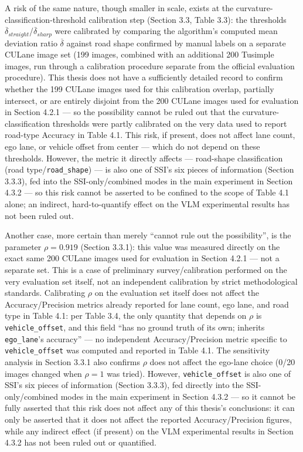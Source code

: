 \documentclass[12pt,a4paper]{report}
\begin{document}
A risk of the same nature, though smaller in scale, exists at the curvature-classification-threshold calibration step (Section 3.3, Table 3.3): the thresholds $\overline{\delta}_{straight}$/$\overline{\delta}_{sharp}$ were calibrated by comparing the algorithm's computed mean deviation ratio $\overline{\delta}$ against road shape confirmed by manual labels on a separate CULane image set (199 images, combined with an additional 200 Tusimple images, run through a calibration procedure separate from the official evaluation procedure). This thesis does not have a sufficiently detailed record to confirm whether the 199 CULane images used for this calibration overlap, partially intersect, or are entirely disjoint from the 200 CULane images used for evaluation in Section 4.2.1 --- so the possibility cannot be ruled out that the curvature-classification thresholds were partly calibrated on the very data used to report road-type Accuracy in Table 4.1. This risk, if present, does not affect lane count, ego lane, or vehicle offset from center --- which do not depend on these thresholds. However, the metric it directly affects --- road-shape classification (road type/\texttt{road\_shape}) --- is also one of SSI's six pieces of information (Section 3.3.3), fed into the SSI-only/combined modes in the main experiment in Section 4.3.2 --- so this risk cannot be asserted to be confined to the scope of Table 4.1 alone; an indirect, hard-to-quantify effect on the VLM experimental results has not been ruled out.

Another case, more certain than merely ``cannot rule out the possibility'', is the parameter $\rho=0.919$ (Section 3.3.1): this value was measured directly on the exact same 200 CULane images used for evaluation in Section 4.2.1 --- not a separate set. This is a case of preliminary survey/calibration performed on the very evaluation set itself, not an independent calibration by strict methodological standards. Calibrating $\rho$ on the evaluation set itself does not affect the Accuracy/Precision metrics already reported for lane count, ego lane, and road type in Table 4.1: per Table 3.4, the only quantity that depends on $\rho$ is \texttt{vehicle\_offset}, and this field ``has no ground truth of its own; inherits \texttt{ego\_lane}'s accuracy'' --- no independent Accuracy/Precision metric specific to \texttt{vehicle\_offset} was computed and reported in Table 4.1. The sensitivity analysis in Section 3.3.1 also confirms $\rho$ does not affect the ego-lane choice (0/20 images changed when $\rho=1$ was tried). However, \texttt{vehicle\_offset} is also one of SSI's six pieces of information (Section 3.3.3), fed directly into the SSI-only/combined modes in the main experiment in Section 4.3.2 --- so it cannot be fully asserted that this risk does not affect any of this thesis's conclusions: it can only be asserted that it does not affect the reported Accuracy/Precision figures, while any indirect effect (if present) on the VLM experimental results in Section 4.3.2 has not been ruled out or quantified.
\end{document}
